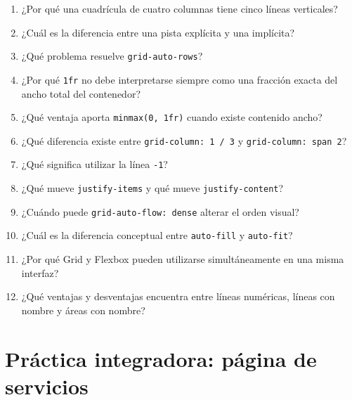 \documentclass[11pt]{article}
\begin{document}
\begin{enumerate}
    \item ¿Por qué una cuadrícula de cuatro columnas tiene cinco líneas verticales?
    \item ¿Cuál es la diferencia entre una pista explícita y una implícita?
    \item ¿Qué problema resuelve \texttt{grid-auto-rows}?
    \item ¿Por qué \texttt{1fr} no debe interpretarse siempre como una fracción
    exacta del ancho total del contenedor?
    \item ¿Qué ventaja aporta \texttt{minmax(0, 1fr)} cuando existe contenido ancho?
    \item ¿Qué diferencia existe entre \texttt{grid-column: 1 / 3} y
    \texttt{grid-column: span 2}?
    \item ¿Qué significa utilizar la línea \texttt{-1}?
    \item ¿Qué mueve \texttt{justify-items} y qué mueve \texttt{justify-content}?
    \item ¿Cuándo puede \texttt{grid-auto-flow: dense} alterar el orden visual?
    \item ¿Cuál es la diferencia conceptual entre \texttt{auto-fill} y
    \texttt{auto-fit}?
    \item ¿Por qué Grid y Flexbox pueden utilizarse simultáneamente en una misma
    interfaz?
    \item ¿Qué ventajas y desventajas encuentra entre líneas numéricas,
    líneas con nombre y áreas con nombre?
\end{enumerate}

\section{Práctica integradora: página de servicios}

\end{document}
